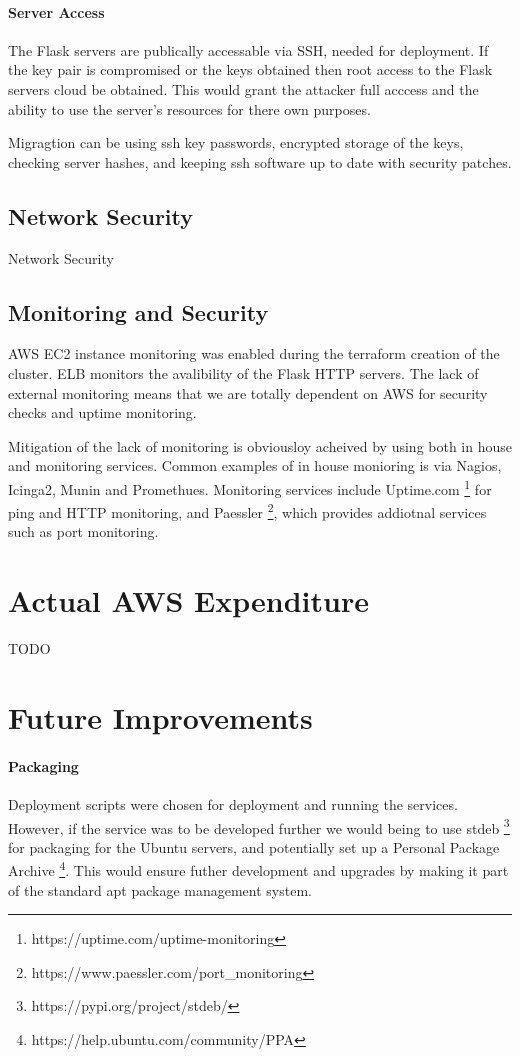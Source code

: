 \documentclass[conference]{IEEEtran}
\begin{document}
\paragraph{Server Access}
The Flask servers are publically accessable via SSH, needed for deployment. If the key pair is compromised or the keys obtained then root access to the Flask servers cloud be obtained. This would grant the attacker full acccess and the ability to use the server's resources for there own purposes. \par
Migragtion can be using ssh key passwords, encrypted storage of the keys, checking server hashes, and keeping ssh software up to date with security patches.
\subsection{Network Security}
Network Security
\subsection{Monitoring and Security}
AWS EC2 instance monitoring was enabled during the terraform creation of the cluster. ELB monitors the avalibility of the Flask HTTP servers. The lack of external monitoring means that we are totally dependent on AWS for security checks and uptime monitoring. \par
Mitigation of the lack of monitoring is obviousloy acheived by using both in house and monitoring services. Common examples of in house monioring is via Nagios, Icinga2, Munin and Promethues. Monitoring services include Uptime.com \footnote{https://uptime.com/uptime-monitoring} for ping and HTTP monitoring, and Paessler \footnote{https://www.paessler.com/port\_monitoring}, which provides addiotnal services such as port monitoring.
\section{Actual AWS Expenditure}
TODO
\section{Future Improvements}
\paragraph{Packaging}
Deployment scripts were chosen for deployment and running the services. However, if the service was to be developed further we would being to use stdeb \footnote{https://pypi.org/project/stdeb/} for packaging for the Ubuntu servers, and potentially set up a Personal Package Archive \footnote{https://help.ubuntu.com/community/PPA}. This would ensure futher development and upgrades by making it part of the standard apt package management system.
\end{document}
